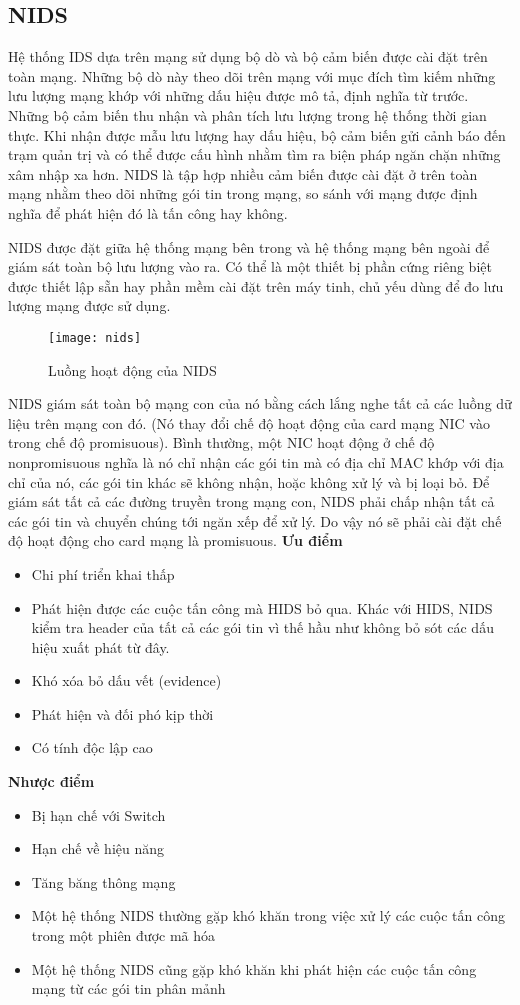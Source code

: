 \subsection{NIDS}
Hệ thống IDS dựa trên mạng sử dụng bộ dò và bộ cảm biến được cài đặt trên toàn mạng. Những bộ dò này theo dõi trên mạng với mục đích tìm kiếm những lưu lượng mạng khớp với những dấu hiệu được mô tả, định nghĩa từ trước. Những bộ cảm biến thu nhận và phân tích lưu lượng trong hệ thống thời gian thực. Khi nhận được mẫu lưu lượng hay dấu hiệu, bộ cảm biến gửi cảnh báo đến trạm quản trị và có thể được cấu hình nhằm tìm ra biện pháp ngăn chặn những xâm nhập xa hơn. NIDS là tập hợp nhiều cảm biến được cài đặt ở trên toàn mạng nhằm theo dõi những gói tin trong mạng, so sánh với mạng được định nghĩa để phát hiện đó là tấn công hay không.
\par
NIDS được đặt giữa hệ thống mạng bên trong và hệ thống mạng bên ngoài để giám sát toàn bộ lưu lượng vào ra. Có thể là một thiết bị phần cứng riêng biệt được thiết lập sẵn hay phần mềm cài đặt trên máy tinh, chủ yếu dùng để đo lưu lượng mạng được sử dụng.
\begin{figure}[!htbp]
    \centering
    \texttt{[image: nids]}
    \caption{Luồng hoạt động của NIDS}
    \label{fig:x cubed graph}
\end{figure}
\FloatBarrier
NIDS giám sát toàn bộ mạng con của nó bằng cách lắng nghe tất cả các luồng dữ liệu trên mạng con đó. (Nó thay đổi chế độ hoạt động của card mạng NIC vào trong chế độ promisuous). Bình thường, một NIC hoạt động ở chế độ nonpromisuous nghĩa là nó chỉ nhận các gói tin mà có địa chỉ MAC khớp với địa chỉ của nó, các gói tin khác sẽ không nhận, hoặc không xử lý và bị loại bỏ.
Để giám sát tất cả các đường truyền trong mạng con, NIDS phải chấp nhận tất cả các gói tin và chuyển chúng tới ngăn xếp để xử lý. Do vậy nó sẽ phải cài đặt chế độ hoạt động cho card mạng là promisuous.
\newline
\newline
\textbf{Ưu điểm}
\begin{itemize}
    \item Chi phí triển khai thấp
    \item Phát hiện được các cuộc tấn công mà HIDS bỏ qua. 
    \newline Khác với HIDS, NIDS kiểm tra header của tất cả các gói tin vì thế hầu như không bỏ sót các dấu hiệu xuất phát từ đây.
    \item Khó xóa bỏ dấu vết (evidence)
    \item Phát hiện và đối phó kịp thời
    \item Có tính độc lập cao
\end{itemize}
\textbf{Nhược điểm}
\begin{itemize}
    \item Bị hạn chế với Switch
    \item Hạn chế về hiệu năng
    \item Tăng băng thông mạng
    \item Một hệ thống NIDS thường gặp khó khăn trong việc xử lý các cuộc tấn công trong một phiên được mã hóa
    \item Một hệ thống NIDS cũng gặp khó khăn khi phát hiện các cuộc tấn công mạng từ các gói tin phân mảnh
\end{itemize}
